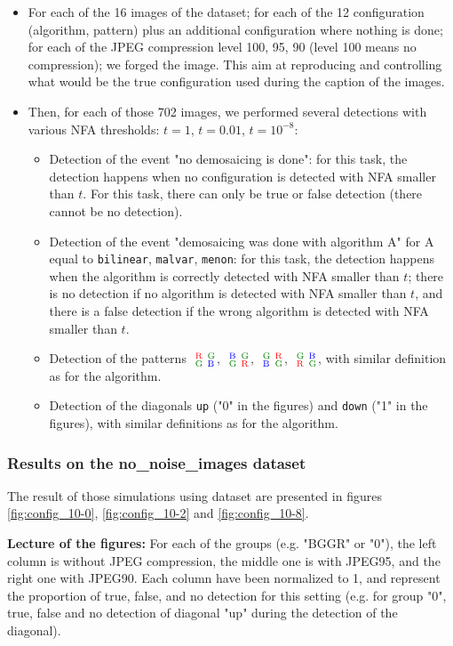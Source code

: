 \documentclass[sigconf, nonacm]{acmart}
\newcommand{\RGGB}{$
~^{\text{\color{red}R}}_{\text{\color{darkgreen}G}}
~^{\text{\color{darkgreen}G}}_{\text{\color{darkblue}B}}
$}
\newcommand{\BGGR}{$
~^{\text{\color{darkblue}B}}_{\text{\color{darkgreen}G}}
~^{\text{\color{darkgreen}G}}_{\text{\color{red}R}}
$}
\newcommand{\GRBG}{$
~^{\text{\color{darkgreen}G}}_{\text{\color{darkblue}B}}
~^{\text{\color{red}R}}_{\text{\color{darkgreen}G}}
$}
\newcommand{\GBRG}{$
~^{\text{\color{darkgreen}G}}_{\text{\color{red}R}}
~^{\text{\color{darkblue}B}}_{\text{\color{darkgreen}G}}
$}
\begin{document}
\begin{itemize}
    \item For each of the 16 images of the dataset; for each of the 12 configuration (algorithm, pattern) plus an additional configuration where nothing is done; for each of the JPEG compression level 100, 95, 90 (level 100 means no compression); we forged the image. This aim at reproducing and controlling what would be the true configuration used during the caption of the images.
    \item Then, for each of those 702 images, we performed several detections with various NFA thresholds: $t = 1$, $t = 0.01$, $t = 10^{-8}$:
    \begin{itemize}
        \item Detection of the event "no demosaicing is done": for this task, the detection happens when no configuration is detected with NFA smaller than $t$. For this task, there can only be true or false detection (there cannot be no detection).
        \item Detection of the event "demosaicing was done with algorithm A" for A equal to \texttt{bilinear}, \texttt{malvar}, \texttt{menon}: for this task, the detection happens when the algorithm is correctly detected with NFA smaller than $t$; there is no detection if no algorithm is detected with NFA smaller than $t$, and there is a false detection if the wrong algorithm is detected with NFA smaller than $t$.
        \item Detection of the patterns \RGGB, \BGGR, \GRBG, \GBRG, with similar definition as for the algorithm.
        \item Detection of the diagonals \texttt{up} ("0" in the figures) and \texttt{down} ("1" in the figures), with similar definitions as for the algorithm.
    \end{itemize}
\end{itemize}

\subsubsection{Results on the no\_noise\_images dataset}

The result of those simulations using dataset \cite{colom_noise_2023} are presented in figures \ref{fig:config_10-0}, \ref{fig:config_10-2} and \ref{fig:config_10-8}.

\medskip \textbf{Lecture of the figures:} For each of the groups (e.g. "BGGR" or "0"), the left column is without JPEG compression, the middle one is with JPEG95, and the right one with JPEG90. Each column have been normalized to 1, and represent the proportion of true, false, and no detection for this setting (e.g. for group "0", true, false and no detection of diagonal "up" during the detection of the diagonal).
\end{document}

